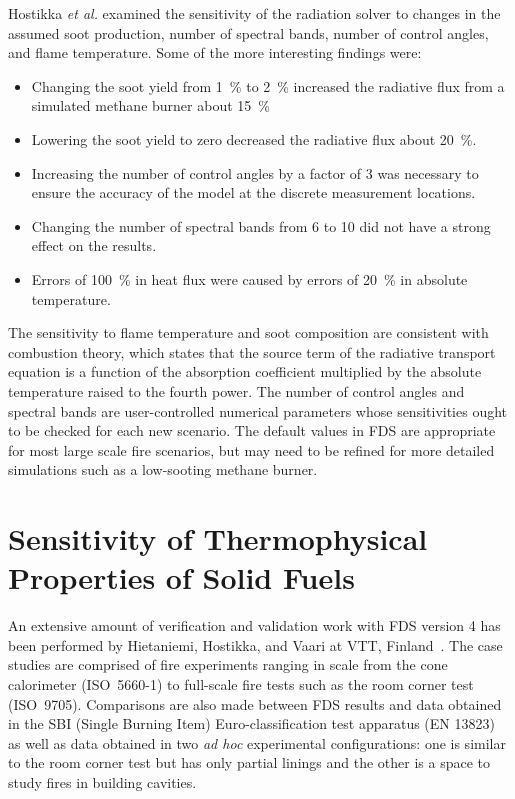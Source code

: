 \documentclass[11pt]{book}
\begin{document}
Hostikka {\em et al.} examined the sensitivity of the radiation solver
to changes in  the assumed soot production, number  of spectral bands,
number  of control  angles, and  flame temperature.  Some of  the more
interesting findings were:
\begin{itemize}
\item  Changing  the  soot  yield  from 1~\%  to  2~\%  increased  the
radiative flux from a simulated methane burner about 15~\%
\item Lowering  the soot  yield to zero  decreased the  radiative flux
about 20~\%.
\item Increasing  the number of  control angles by  a factor of  3 was
necessary  to  ensure  the  accuracy  of the  model  at  the  discrete
measurement locations.
\item Changing the number of spectral  bands from 6 to 10 did not have
a strong effect on the results.
\item Errors of 100~\% in heat  flux were caused by errors of 20~\% in
absolute temperature.
\end{itemize}
The  sensitivity  to  flame   temperature  and  soot  composition  are
consistent with  combustion theory, which states that  the source term
of the  radiative transport equation  is a function of  the absorption
coefficient  multiplied  by the  absolute  temperature  raised to  the
fourth  power. The  number of  control angles  and spectral  bands are
user-controlled numerical  parameters whose sensitivities  ought to be
checked  for  each  new  scenario.  The  default  values  in  FDS  are
appropriate for  most large scale fire  scenarios, but may  need to be
refined for  more detailed simulations  such as a  low-sooting methane
burner.


\section{Sensitivity of Thermophysical Properties of Solid Fuels}

An  extensive amount  of  verification and  validation  work with  FDS
version 4  has been  performed by Hietaniemi,  Hostikka, and  Vaari at
VTT,  Finland~\cite{Hietaniemi:1}. The case  studies are  comprised of
fire  experiments   ranging  in   scale  from  the   cone  calorimeter
(ISO~5660-1) to  full-scale fire  tests such as  the room  corner test
(ISO~9705).  Comparisons are also  made between  FDS results  and data
obtained  in the  SBI (Single  Burning Item)  Euro-classification test
apparatus (EN  13823) as  well as  data obtained in  two {\em  ad hoc}
experimental configurations:  one is similar  to the room  corner test
but has only  partial linings and the other is a  space to study fires
in building cavities.
\end{document}

